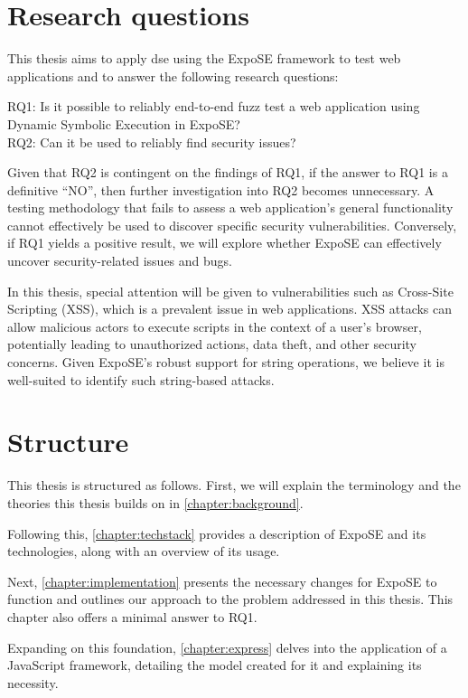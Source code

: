 \newpage

\section{Research questions}
\label{sec:research-questions}

This thesis aims to apply \gls{dse} using the ExpoSE framework to test web applications and to answer the following research questions:

RQ1: Is it possible to reliably end-to-end fuzz test a web application using Dynamic Symbolic Execution in ExpoSE?\\
RQ2: Can it be used to reliably find security issues?

Given that RQ2 is contingent on the findings of RQ1, if the answer to RQ1 is a definitive “NO”, then further investigation into RQ2 becomes unnecessary. A testing methodology that fails to assess a web application's general functionality cannot effectively be used to discover specific security vulnerabilities. Conversely, if RQ1 yields a positive result, we will explore whether ExpoSE can effectively uncover security-related issues and bugs.

In this thesis, special attention will be given to vulnerabilities such as Cross-Site Scripting (XSS), which is a prevalent issue in web applications. XSS attacks can allow malicious actors to execute scripts in the context of a user's browser, potentially leading to unauthorized actions, data theft, and other security concerns. Given ExpoSE's robust support for string operations, we believe it is well-suited to identify such string-based attacks.

\section{Structure}
\label{sec:thesis-structure}
This thesis is structured as follows. First, we will explain the terminology and the theories this thesis builds on in \autoref{chapter:background}. 

Following this, \autoref{chapter:techstack} provides a description of ExpoSE and its technologies, along with an overview of its usage.

Next, \autoref{chapter:implementation} presents the necessary changes for ExpoSE to function and outlines our approach to the problem addressed in this thesis. This chapter also offers a minimal answer to RQ1.

Expanding on this foundation, \autoref{chapter:express} delves into the application of a JavaScript framework, detailing the model created for it and explaining its necessity. 

